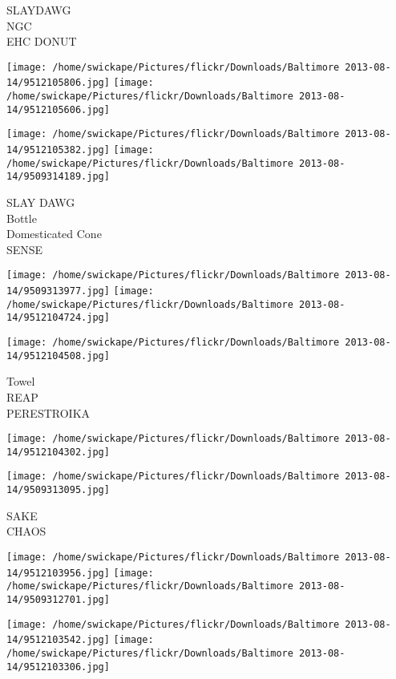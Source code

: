 \documentclass[10pt,letterpaper]{article}
\begin{document}
SLAYDAWG\\
NGC\\
EHC DONUT\\
\pagebreak

\texttt{[image: /home/swickape/Pictures/flickr/Downloads/Baltimore 2013-08-14/9512105806.jpg]}
\texttt{[image: /home/swickape/Pictures/flickr/Downloads/Baltimore 2013-08-14/9512105606.jpg]}

\texttt{[image: /home/swickape/Pictures/flickr/Downloads/Baltimore 2013-08-14/9512105382.jpg]}
\texttt{[image: /home/swickape/Pictures/flickr/Downloads/Baltimore 2013-08-14/9509314189.jpg]}

SLAY DAWG\\
Bottle\\
Domesticated Cone\\
SENSE\\
\pagebreak

\texttt{[image: /home/swickape/Pictures/flickr/Downloads/Baltimore 2013-08-14/9509313977.jpg]}
\texttt{[image: /home/swickape/Pictures/flickr/Downloads/Baltimore 2013-08-14/9512104724.jpg]}

\vspace{0.25in}
\texttt{[image: /home/swickape/Pictures/flickr/Downloads/Baltimore 2013-08-14/9512104508.jpg]}

Towel\\
REAP\\
PERESTROIKA\\
\pagebreak

\texttt{[image: /home/swickape/Pictures/flickr/Downloads/Baltimore 2013-08-14/9512104302.jpg]}

\vspace{0.25in}
\texttt{[image: /home/swickape/Pictures/flickr/Downloads/Baltimore 2013-08-14/9509313095.jpg]}

SAKE\\
CHAOS\\
\pagebreak

\texttt{[image: /home/swickape/Pictures/flickr/Downloads/Baltimore 2013-08-14/9512103956.jpg]}
\texttt{[image: /home/swickape/Pictures/flickr/Downloads/Baltimore 2013-08-14/9509312701.jpg]}

\texttt{[image: /home/swickape/Pictures/flickr/Downloads/Baltimore 2013-08-14/9512103542.jpg]}
\texttt{[image: /home/swickape/Pictures/flickr/Downloads/Baltimore 2013-08-14/9512103306.jpg]}
\end{document}
